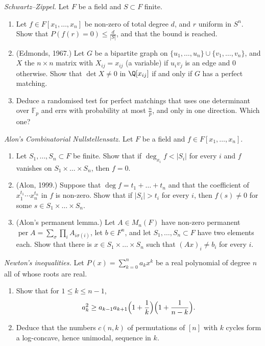 \begin{exercise}[$\star$]\label{pb:schwartz}
\emph{Schwartz--Zippel.} Let $F$ be a field and $S\subset F$ finite.
\begin{enumerate}[label=(\alph*)]
\item Let $f\in F[x_1,\dots,x_n]$ be non-zero of total degree $d$, and $r$ uniform in $S^n$. Show that $P(f(r)=0)\le\frac d{|S|}$,
and that the bound is reached.
\item (Edmonds, 1967.) Let $G$ be a bipartite graph on $\{u_1,\dots,u_n\}\cup\{v_1,\dots,v_n\}$, and $X$ the $n\times n$ matrix with
$X_{ij}=x_{ij}$ (a variable) if $u_iv_j$ is an edge and $0$ otherwise. Show that $\det X\ne0$ in $\Q[x_{ij}]$ if and only if $G$ has
a perfect matching.
\item Deduce a randomised test for perfect matchings that uses one determinant over $\mathbb F_p$ and errs with probability at
most $\frac np$, and only in one direction. Which one?
\end{enumerate}
\end{exercise}

\begin{exercise}[$\star\star$]\label{pb:nullstellensatz}
\emph{Alon's Combinatorial Nullstellensatz.} Let $F$ be a field and $f\in F[x_1,\dots,x_n]$.
\begin{enumerate}[label=(\alph*)]
\item Let $S_1,\dots,S_n\subset F$ be finite. Show that if $\deg_{x_i}f<|S_i|$ for every $i$ and $f$ vanishes on
$S_1\times\dots\times S_n$, then $f=0$.
\item (Alon, 1999.) Suppose that $\deg f=t_1+\dots+t_n$ and that the coefficient of $x_1^{t_1}\cdots x_n^{t_n}$ in $f$ is non-zero.
Show that if $|S_i|>t_i$ for every $i$, then $f(s)\ne0$ for some $s\in S_1\times\dots\times S_n$.
\item (Alon's permanent lemma.) Let $A\in M_n(F)$ have non-zero permanent $\operatorname{per}A=\sum_\sigma\prod_iA_{i\sigma(i)}$,
let $b\in F^n$, and let $S_1,\dots,S_n\subset F$ have two elements each. Show that there is $x\in S_1\times\dots\times S_n$ such
that $(Ax)_i\ne b_i$ for every $i$.
\end{enumerate}
\end{exercise}

\begin{exercise}[$\star\star$]\label{pb:newton}
\emph{Newton's inequalities.} Let $P(x)=\sum_{k=0}^na_kx^k$ be a real polynomial of degree $n$ all of whose roots are real.
\begin{enumerate}[label=(\alph*)]
\item Show that for $1\le k\le n-1$,
\[
a_k^2\ge a_{k-1}a_{k+1}\Bigl(1+\frac1k\Bigr)\Bigl(1+\frac1{n-k}\Bigr).
\]
\item Deduce that the numbers $c(n,k)$ of permutations of $[n]$ with $k$ cycles form a log-concave, hence unimodal, sequence in $k$.
\end{enumerate}
\end{exercise}

